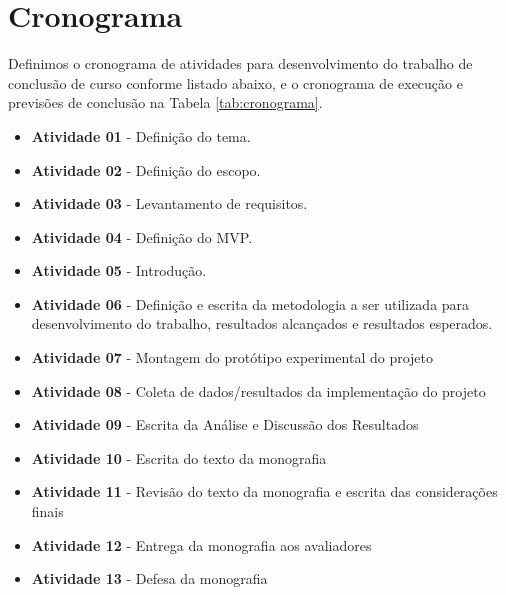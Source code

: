 \section{Cronograma}


Definimos o cronograma de atividades para desenvolvimento do trabalho de conclusão de curso conforme listado abaixo, e o cronograma de execução e previsões de conclusão na Tabela \ref{tab:cronograma}.

\begin{itemize}
    \item \textbf{Atividade 01} - Definição do tema.
    
    \item \textbf{Atividade 02} - Definição do escopo.
   
    \item \textbf{Atividade 03} - Levantamento de requisitos.
    
    \item \textbf{Atividade 04} - Definição do MVP.
    
    \item \textbf{Atividade 05} - Introdução.
    
    \item \textbf{Atividade 06} - Definição e escrita da metodologia a ser utilizada para desenvolvimento do trabalho, resultados alcançados e  resultados esperados.
    
    \item \textbf{Atividade 07} - Montagem do protótipo experimental do projeto
    
    \item \textbf{Atividade 08} - Coleta de dados/resultados da implementação do projeto
    
    \item \textbf{Atividade 09} - Escrita da Análise e Discussão dos Resultados
    
    \item \textbf{Atividade 10} - Escrita do texto da monografia
    
    \item \textbf{Atividade 11} - Revisão do texto da monografia e escrita das considerações finais
    
    \item \textbf{Atividade 12} - Entrega da monografia aos avaliadores
    
    \item \textbf{Atividade 13} - Defesa da monografia
    
\end{itemize}

